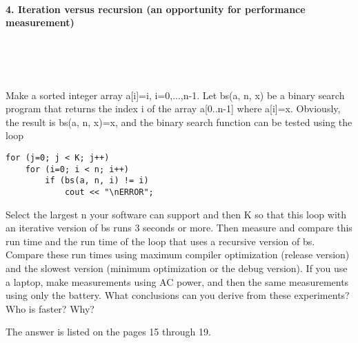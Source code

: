 \documentclass{article}
\begin{document}
	\rmfamily
	
	\paragraph{4. Iteration versus recursion (an opportunity for performance measurement) }\
	
	\rmfamily\
	
		Make a sorted integer array a[i]=i, i=0,...,n-1.  Let bs(a, n, x) be a binary search program that returns the index i of the array a[0..n-1] where a[i]=x. Obviously, the result is bs(a, n, x)=x, and the binary search function can be tested using the loop
		
		\begin{verbatim}
for (j=0; j < K; j++)
    for (i=0; i < n; i++)
        if (bs(a, n, i) != i)
            cout << "\nERROR";
		\end{verbatim}
		
		
		Select the largest n your software can support and then K so that this loop with an iterative version of bs runs 3 seconds or more. Then measure and compare this run time and the run time of the loop that uses a recursive version of bs. Compare these run times using maximum compiler optimization (release version) and the slowest version (minimum optimization or the debug version). If you use a laptop, make measurements using AC power, and then the same measurements using only the battery. What conclusions can you derive from these experiments? Who is faster? Why?
		\newline
		
		The answer is listed on the pages 15 through 19.
	

\paragraph{}\
\paragraph{}\

\paragraph{}\
\paragraph{}\
\paragraph{}\
\end{document}
